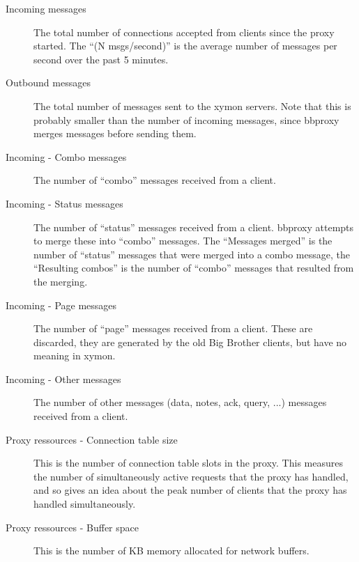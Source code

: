  \begin{description}
\item[Incoming messages] The total number of connections accepted from clients since the proxy started. The ``(N msgs/second)'' is the average number of messages per second over the past 5 minutes. 

 

\item[Outbound messages] The total number of messages sent to the xymon servers. Note that this is probably smaller than the number of incoming messages, since bbproxy merges messages before sending them. 

 

\item[Incoming - Combo messages] The number of ``combo'' messages received from a client. 

 

\item[Incoming - Status messages] The number of ``status'' messages received from a client. bbproxy attempts to merge these into ``combo'' messages. The ``Messages merged'' is the number of ``status'' messages that were merged into a combo message, the ``Resulting combos'' is the number of ``combo'' messages that resulted from the merging. 

 

\item[Incoming - Page messages] The number of ``page'' messages received from a client. These are discarded, they are generated by the old Big Brother clients, but have no meaning in xymon. 

 

\item[Incoming - Other messages] The number of other messages (data, notes, ack, query, ...) messages received from a client. 

 

\item[Proxy ressources - Connection table size] This is the number of connection table slots in the proxy. This measures the number of simultaneously active requests that the proxy has handled, and so gives an idea about the peak number of clients that the proxy has handled simultaneously. 

 

\item[Proxy ressources - Buffer space] This is the number of KB memory allocated for network buffers. 

 


\end{description}
